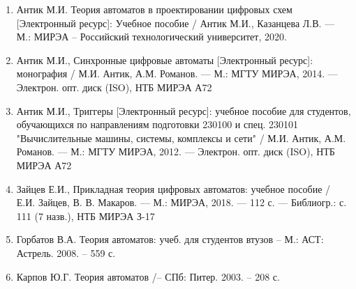 \documentclass[a4paper,14pt]{extarticle}
\begin{document}
\label{biblio}
\begin{enumerate}
	\item Антик М.И. Теория автоматов в проектировании цифровых схем
	[Электронный ресурс]: Учебное пособие / Антик М.И., Казанцева
	Л.В. — М.: МИРЭА – Российский технологический университет,
	2020.
	\item Антик М.И., Синхронные цифровые автоматы [Электронный ресурс]:
	монография / М.И. Антик, А.М. Романов. — М.: МГТУ МИРЭА,
	2014. — Электрон. опт. диск (ISO), НТБ МИРЭА А72
	\item Антик М.И., Триггеры [Электронный ресурс]: учебное пособие для
	студентов, обучающихся по направлениям подготовки 230100 и спец.
	230101 "Вычислительные машины, системы, комплексы и сети" /
	М.И. Антик, А.М. Романов. — М.: МГТУ МИРЭА, 2012. — Электрон.
	опт. диск (ISO), НТБ МИРЭА А72
	\item Зайцев Е.И., Прикладная теория цифровых автоматов: учебное пособие / Е.И. Зайцев, В. В. Макаров. — М.: МИРЭА, 2018. — 112 с. —
	Библиогр.: с. 111 (7 назв.), НТБ МИРЭА З-17
	\item Горбатов В.А. Теория автоматов: учеб. для студентов втузов – М.:
	АСТ: Астрель. 2008. – 559 с.
	\item  Карпов Ю.Г. Теория автоматов /– СПб: Питер. 2003. – 208 с.
\end{enumerate}
\end{document}
